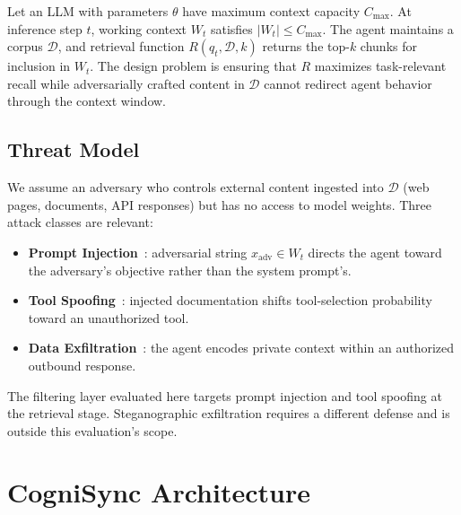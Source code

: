 \documentclass[sigconf]{acmart}
\begin{document}
Let an LLM with parameters $\theta$ have maximum context capacity $C_{\max}$.
At inference step $t$, working context $W_t$ satisfies
$\lvert W_t\rvert \leq C_{\max}$. The agent maintains a corpus $\mathcal{D}$,
and retrieval function $R(q_t,\mathcal{D},k)$ returns the top-$k$ chunks for
inclusion in $W_t$. The design problem is ensuring that $R$ maximizes
task-relevant recall while adversarially crafted content in $\mathcal{D}$
cannot redirect agent behavior through the context window.

\subsection{Threat Model}

We assume an adversary who controls external content ingested into
$\mathcal{D}$ (web pages, documents, API responses) but has no access to model
weights. Three attack classes are relevant:

\begin{itemize}
\item \textbf{Prompt Injection}~\cite{perez2022injection}: adversarial string $x_{\mathrm{adv}} \in W_t$
directs the agent toward the adversary's objective rather than the system
prompt's.
\item \textbf{Tool Spoofing}~\cite{shi2025toolhijacker}: injected documentation shifts tool-selection
probability toward an unauthorized tool.
\item \textbf{Data Exfiltration}~\cite{greshake2023indirect}: the agent encodes private context within an
authorized outbound response.
\end{itemize}

The filtering layer evaluated here targets prompt injection and tool spoofing
at the retrieval stage. Steganographic exfiltration requires a different
defense and is outside this evaluation's scope.

\section{CogniSync Architecture}
\end{document}
